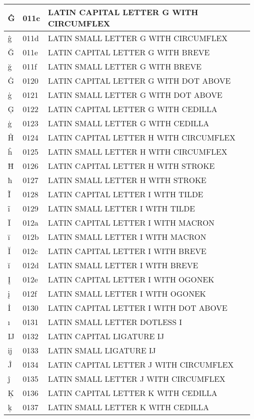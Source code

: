 \documentclass[12pt,letterpaper,openany]{book}
\begin{document}
\begin{center}
\begin{supertabular}{|m{0.25in}|m{0.5in}|m{4in}|}
Ĝ & 011c & LATIN CAPITAL LETTER G WITH CIRCUMFLEX\\\hline
ĝ & 011d & LATIN SMALL LETTER G WITH CIRCUMFLEX\\\hline
Ğ & 011e & LATIN CAPITAL LETTER G WITH BREVE\\\hline
ğ & 011f & LATIN SMALL LETTER G WITH BREVE\\\hline
Ġ & 0120 & LATIN CAPITAL LETTER G WITH DOT ABOVE\\\hline
ġ & 0121 & LATIN SMALL LETTER G WITH DOT ABOVE\\\hline
Ģ & 0122 & LATIN CAPITAL LETTER G WITH CEDILLA\\\hline
ģ & 0123 & LATIN SMALL LETTER G WITH CEDILLA\\\hline
Ĥ & 0124 & LATIN CAPITAL LETTER H WITH CIRCUMFLEX\\\hline
ĥ & 0125 & LATIN SMALL LETTER H WITH CIRCUMFLEX\\\hline
Ħ & 0126 & LATIN CAPITAL LETTER H WITH STROKE\\\hline
ħ & 0127 & LATIN SMALL LETTER H WITH STROKE\\\hline
Ĩ & 0128 & LATIN CAPITAL LETTER I WITH TILDE\\\hline
ĩ & 0129 & LATIN SMALL LETTER I WITH TILDE\\\hline
Ī & 012a & LATIN CAPITAL LETTER I WITH MACRON\\\hline
ī & 012b & LATIN SMALL LETTER I WITH MACRON\\\hline
Ĭ & 012c & LATIN CAPITAL LETTER I WITH BREVE\\\hline
ĭ & 012d & LATIN SMALL LETTER I WITH BREVE\\\hline
Į & 012e & LATIN CAPITAL LETTER I WITH OGONEK\\\hline
į & 012f & LATIN SMALL LETTER I WITH OGONEK\\\hline
İ & 0130 & LATIN CAPITAL LETTER I WITH DOT ABOVE\\\hline
ı & 0131 & LATIN SMALL LETTER DOTLESS I\\\hline
Ĳ & 0132 & LATIN CAPITAL LIGATURE IJ\\\hline
ĳ & 0133 & LATIN SMALL LIGATURE IJ\\\hline
Ĵ & 0134 & LATIN CAPITAL LETTER J WITH CIRCUMFLEX\\\hline
ĵ & 0135 & LATIN SMALL LETTER J WITH CIRCUMFLEX\\\hline
Ķ & 0136 & LATIN CAPITAL LETTER K WITH CEDILLA\\\hline
ķ & 0137 & LATIN SMALL LETTER K WITH CEDILLA\\\hline

\end{supertabular}
\end{center}
\end{document}
